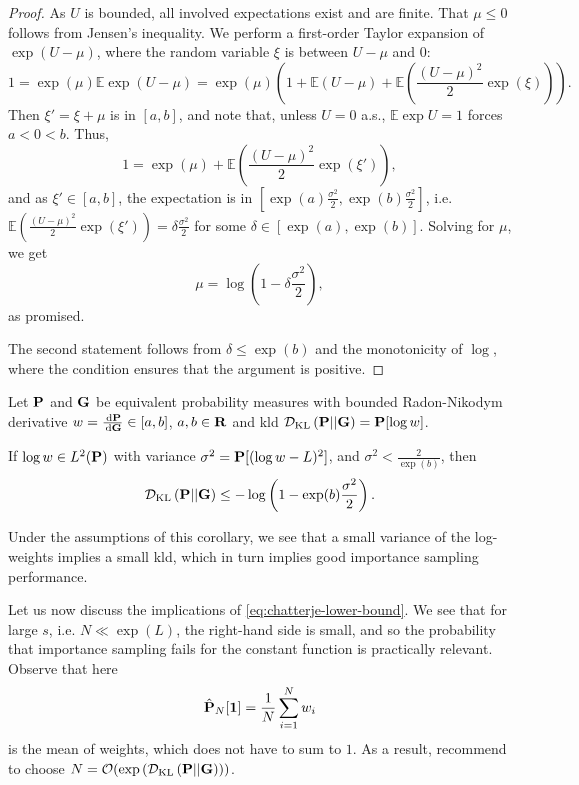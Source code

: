 \begin{proof}
    As $U$ is bounded, all involved expectations exist and are finite. That $\mu \leq 0$ follows from Jensen's inequality. We perform a first-order Taylor expansion of $\exp(U - \mu)$, where the random variable $\xi$ is between $U - \mu$ and $0$:
    $$
    1 = \exp(\mu)\mathbb E \exp (U - \mu) = \exp (\mu) \left( 1 + \mathbb E (U - \mu) + \mathbb E\left(\frac{(U-\mu)^{2}}{2} \exp(\xi)\right) \right).
    $$
    Then $\xi' = \xi + \mu$ is in $[a,b]$, and note that, unless $U = 0$ a.s., $\mathbb E \exp U = 1$ forces $a < 0 < b$. 
    Thus,
    $$
    1 = \exp(\mu) + \mathbb E\left(\frac{(U-\mu)^{2}}{2} \exp(\xi')\right),
    $$
    and as $\xi' \in [a,b]$, the expectation is in $\left[\exp(a) \frac{\sigma^{2}}{2}, \exp(b) \frac{\sigma^{2}}{2}\right]$, i.e. $\mathbb E\left(\frac{(U-\mu)^{2}}{2} \exp(\xi')\right) = \delta \frac{\sigma^{2}}{2}$ for some $\delta \in [\exp(a),\exp(b)]$. Solving for $\mu$, we get 
    $$
    \mu = \log \left( 1 - \delta \frac{\sigma^{2}}{2} \right),
    $$
    as promised.

    The second statement follows from $\delta \leq \exp(b)$ and the monotonicity of $\log$, where the condition ensures that the argument is positive.
\end{proof}

\begin{corollary}
    \label{cor:dkl_bounded}
    Let $\P$ and $\G$ be equivalent probability measures with bounded Radon-Nikodym derivative $w = \frac{\d\P}{\d\G} \in [a,b]$, $a, b \in \R$ and \gls{kld} $\Dkl{\P}{\G} =\P [\log w]$.
    
    If $\log w \in L^{2}(\P)$ with variance $\sigma^{2} = \P [(\log w - L)^2]$, and $\sigma^{2} < \frac{2}{\exp(b)}$, then 
    $$
    \Dkl{\P}{\G} \leq - \log \left(1 - \exp(b) \frac{\sigma^{2}}{2} \right).
    $$
\end{corollary}
Under the assumptions of this corollary, we see that a small variance of the log-weights implies a small \gls{kld}, which in turn implies good importance sampling performance.

Let us now discuss the implications of \eqref{eq:chatterje-lower-bound}. We see that for large $s$, i.e. $N \ll \exp(L)$, the right-hand side is small, and so the probability that importance sampling fails for the constant function is practically relevant. Observe that here 
$$
\hat \P_{N} [\mathbf 1 ] = \frac{1}{N} \sum_{i = 1}^N w_{i}
$$
is the mean of weights, which does not have to sum to $1$. 
As a result, \citeauthor{Chatterjee2018Sample} recommend to choose $N = \mathcal O( \exp \left( \Dkl{\P}{\G} \right))$. 


